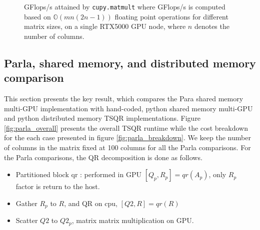 \documentclass{article}
\begin{document}
\begin{figure}[!bhp]
    \centering
    \caption{GFlops/s  attained by \texttt{cupy.matmult} where  GFlops/s is computed based on $\mathbb{O}(mn(2n-1))$ floating point operations for different matrix sizes, on a single RTX5000 GPU node, where $n$ denotes the number of columns.}
\end{figure}

\subsection{Parla, shared memory, and distributed memory comparison}
This section presents the key result, which compares the Para shared memory multi-GPU implementation with hand-coded, python shared memory multi-GPU and python distributed memory TSQR implementations. Figure \ref{fig:parla_overall} presents the overall TSQR runtime while the cost breakdown for the each case presented in figure \ref{fig:parla_breakdown}. We keep the number of columns in the matrix fixed at 100 columns for all the Parla comparisons. For the Parla comparisons, the QR decomposition is done as follows.
\begin{itemize}
    \item Partitioned block qr : performed in GPU $[Q_p,R_p]=qr(A_p)$, only $R_p$ factor is return to the host. 
    \item Gather $R_p$ to $R$, and QR on cpu, $[Q2,R]=qr(R)$
    \item Scatter $Q2$ to $Q2_p$, matrix matrix multiplication on GPU. 
\end{itemize}
\end{document}
